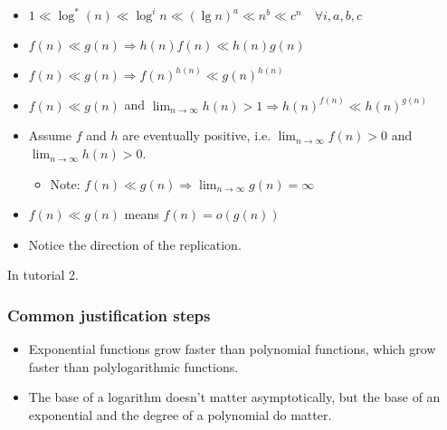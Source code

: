     \begin{intuition}
        \begin{itemize}
            \item \( 1 \ll \log^*(n) \ll \log^i n \ll (\lg n)^a \ll n^b \ll c^n \quad \forall i, a, b, c \)
            
            \item \( f(n) \ll g(n) \Rightarrow h(n)f(n) \ll h(n)g(n) \)
            
            \item \( f(n) \ll g(n) \Rightarrow f(n)^{h(n)} \ll g(n)^{h(n)} \)
            
            \item \( f(n) \ll g(n) \) and \( \lim_{n \to \infty} h(n) > 1 \Rightarrow h(n)^{f(n)} \ll h(n)^{g(n)} \)
            
            \item Assume \( f \) and \( h \) are eventually positive, i.e. \( \lim_{n \to \infty} f(n) > 0 \) and \( \lim_{n \to \infty} h(n) > 0 \). 
            \begin{itemize}
                \item Note: \( f(n) \ll g(n) \Rightarrow \lim_{n \to \infty} g(n) = \infty \)
            \end{itemize}
            
            \item \( f(n) \ll g(n) \) means \( f(n) = o(g(n)) \)
            
            \item Notice the direction of the replication.
        \end{itemize}    
    \end{intuition}

    \begin{derivation}
        In tutorial 2.
    \end{derivation}
    
        \subsubsection{Common justification steps}
        \begin{intuition}
            \begin{itemize}
                \item Exponential functions grow faster than polynomial functions, which grow faster than polylogarithmic functions.
                \item The base of a logarithm doesn’t matter asymptotically, but the base of an exponential and the degree of a polynomial do matter.
            \end{itemize}
        \end{intuition}

